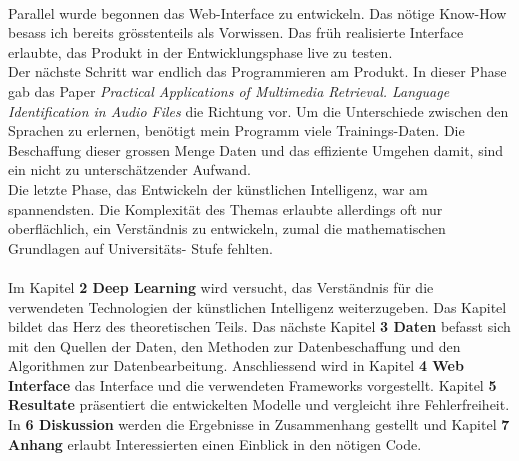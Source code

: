 \\
Parallel wurde begonnen das Web-Interface zu entwickeln. Das nötige Know-How besass ich bereits grösstenteils als Vorwissen. Das früh realisierte Interface erlaubte, das Produkt in der Entwicklungsphase live zu testen. 
\\
Der nächste Schritt war endlich das Programmieren am Produkt. In dieser Phase gab das Paper \textit{Practical Applications of Multimedia Retrieval. Language Identification in Audio
Files}\parencite{iLID} die Richtung vor. 
Um die Unterschiede zwischen den Sprachen zu erlernen, benötigt mein Programm viele Trainings-Daten. Die Beschaffung dieser grossen Menge Daten und das effiziente Umgehen damit, sind ein nicht zu unterschätzender Aufwand. 
\\
Die letzte Phase, das Entwickeln der künstlichen Intelligenz, war am spannendsten. Die Komplexität des Themas erlaubte allerdings oft nur oberflächlich, ein Verständnis zu entwickeln, zumal die mathematischen Grundlagen auf Universitäts- Stufe fehlten. 
\\ \\
Im Kapitel \textbf{2 Deep Learning} wird versucht, das Verständnis für die verwendeten Technologien der künstlichen Intelligenz weiterzugeben. Das Kapitel bildet das Herz des theoretischen Teils. Das nächste Kapitel \textbf{3
Daten} befasst sich mit den Quellen der Daten, den Methoden zur Datenbeschaffung und den Algorithmen zur Datenbearbeitung. Anschliessend wird in Kapitel \textbf{4 Web Interface} das Interface und
die verwendeten Frameworks vorgestellt. Kapitel \textbf{5 Resultate} präsentiert die entwickelten Modelle und vergleicht ihre Fehlerfreiheit. In \textbf{6 Diskussion} werden die
Ergebnisse in Zusammenhang gestellt und Kapitel \textbf{7 Anhang} erlaubt Interessierten einen Einblick in den nötigen Code.

